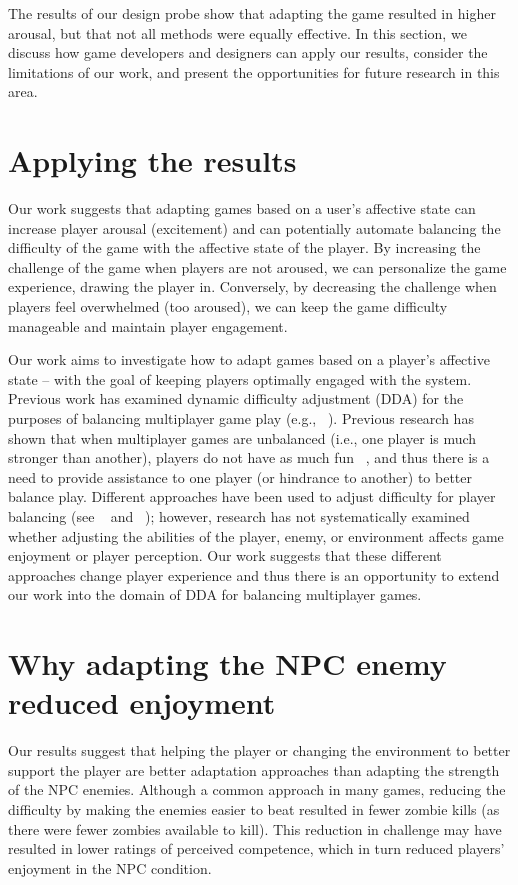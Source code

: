 
The results of our design probe show that adapting the game resulted in higher arousal, but that not all methods were equally effective. In this section, we discuss how game developers and designers can apply our results, consider the limitations of our work, and present the opportunities for future research in this area.

\section{Applying the results}
Our work suggests that adapting games based on a user's affective state can increase player arousal (excitement) and can potentially automate balancing the difficulty of the game with the affective state of the player. By increasing the challenge of the game when players are not aroused, we can personalize the game experience, drawing the player in. Conversely, by decreasing the challenge when players feel overwhelmed (too aroused), we can keep the game difficulty manageable and maintain player engagement.

Our work aims to investigate how to adapt games based on a player's affective state – with the goal of keeping players optimally engaged with the system. Previous work has examined dynamic difficulty adjustment (DDA) for the purposes of balancing multiplayer game play (e.g., ~\cite{bateman2011target}). Previous research has shown that when multiplayer games are unbalanced (i.e., one player is much stronger than another), players do not have as much fun ~\cite{vicencio2014effectiveness}, and thus there is a need to provide assistance to one player (or hindrance to another) to better balance play. Different approaches have been used to adjust difficulty for player balancing (see ~\cite{bateman2011target} and ~\cite{vicencio2014effectiveness}); however, research has not systematically examined whether adjusting the abilities of the player, enemy, or environment affects game enjoyment or player perception. Our work suggests that these different approaches change player experience and thus there is an opportunity to extend our work into the domain of DDA for balancing multiplayer games.

\section{Why adapting the NPC enemy reduced enjoyment}
Our results suggest that helping the player or changing the environment to better support the player are better adaptation approaches than adapting the strength of the NPC enemies. Although a common approach in many games, reducing the difficulty by making the enemies easier to beat resulted in fewer zombie kills (as there were fewer zombies available to kill). This reduction in challenge may have resulted in lower ratings of perceived competence, which in turn reduced players' enjoyment in the NPC condition.

